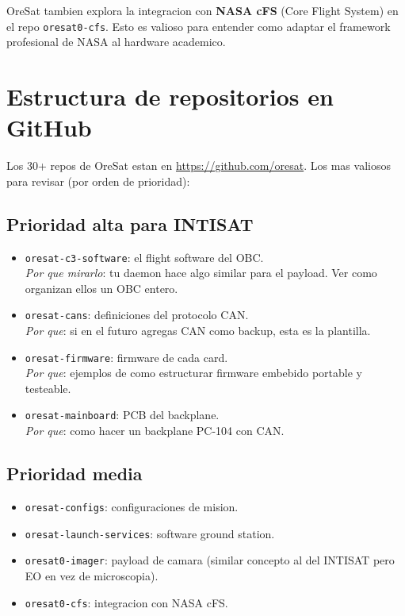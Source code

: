 \documentclass[11pt,a4paper,oneside]{report}
\begin{document}
OreSat tambien explora la integracion con \textbf{NASA cFS} (Core Flight
System) en el repo \texttt{oresat0-cfs}. Esto es valioso para entender
como adaptar el framework profesional de NASA al hardware academico.

\chapter{Estructura de repositorios en GitHub}

Los 30+ repos de OreSat estan en \url{https://github.com/oresat}.
Los mas valiosos para revisar (por orden de prioridad):

\section{Prioridad alta para INTISAT}

\begin{itemize}[leftmargin=2em]
  \item \texttt{oresat-c3-software}: el flight software del OBC. \\
        \emph{Por que mirarlo}: tu daemon hace algo similar para el payload.
        Ver como organizan ellos un OBC entero.
  \item \texttt{oresat-cans}: definiciones del protocolo CAN. \\
        \emph{Por que}: si en el futuro agregas CAN como backup, esta es
        la plantilla.
  \item \texttt{oresat-firmware}: firmware de cada card. \\
        \emph{Por que}: ejemplos de como estructurar firmware embebido
        portable y testeable.
  \item \texttt{oresat-mainboard}: PCB del backplane. \\
        \emph{Por que}: como hacer un backplane PC-104 con CAN.
\end{itemize}

\section{Prioridad media}

\begin{itemize}[leftmargin=2em]
  \item \texttt{oresat-configs}: configuraciones de mision.
  \item \texttt{oresat-launch-services}: software ground station.
  \item \texttt{oresat0-imager}: payload de camara (similar concepto al
        del INTISAT pero EO en vez de microscopia).
  \item \texttt{oresat0-cfs}: integracion con NASA cFS.
\end{itemize}
\end{document}
